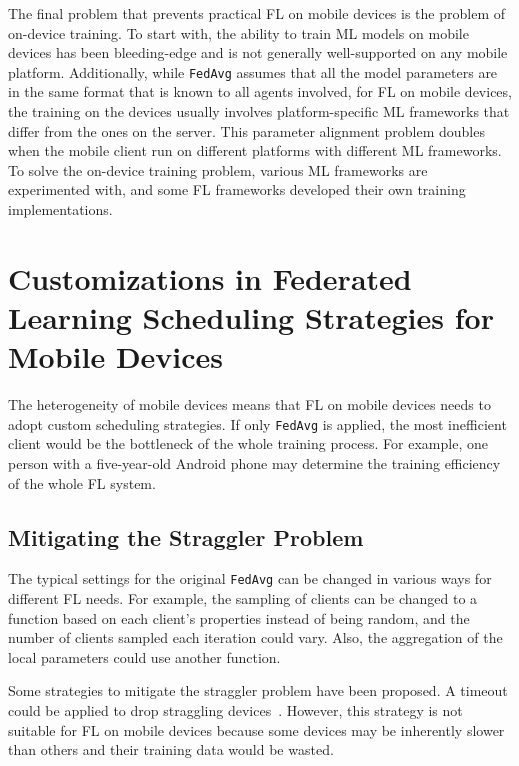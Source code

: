 \documentclass[conference]{IEEEtran}
\begin{document}
The final problem that prevents practical FL on mobile devices is
the problem of on-device training.
To start with, the ability to train ML models on mobile devices has been
bleeding-edge and
is not generally well-supported on any mobile platform.
Additionally,
while \verb|FedAvg| assumes that all the model parameters are
in the same format that is known to all agents involved,
for FL on mobile devices,
the training on the devices usually involves platform-specific ML frameworks
that differ from the ones on the server.
This parameter alignment problem doubles when
the mobile client run on different platforms with
different ML frameworks.
To solve the on-device training problem,
various ML frameworks are experimented with,
and some FL frameworks developed their own training implementations.

\section{Customizations in Federated Learning Scheduling Strategies for
    Mobile Devices
}

\label{sec:scheduling}

The heterogeneity of mobile devices means that FL on mobile devices needs to
adopt custom scheduling strategies.
If only \verb|FedAvg| is applied,
the most inefficient client would be the bottleneck of
the whole training process.
For example, one person with a five-year-old Android phone may determine
the training efficiency of the whole FL system.

\subsection{Mitigating the Straggler Problem}

The typical settings for the original \verb|FedAvg| can be changed in
various ways for different FL needs.
For example,
the sampling of clients can be changed to a function based on
each client's properties instead of being random,
and the number of clients sampled each iteration could vary.
Also, the aggregation of the local parameters could use another function.

Some strategies to mitigate the straggler problem have been proposed.
A timeout could be applied to drop
straggling devices~\cite{bonawitz2019towards}.
However, this strategy is not suitable for FL on mobile devices because
some devices may be inherently slower than others and
their training data would be wasted.
\end{document}
